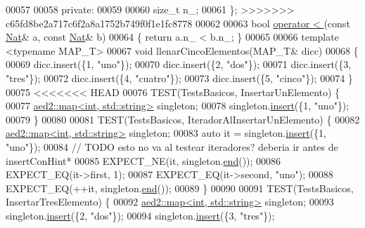 \begin{DoxyCode}
00057 
00058     \textcolor{keyword}{private}:
00059 
00060         \textcolor{keywordtype}{size\_t} n\_;
00061 \};
>>>>>>> c65fd8be2a717c6f2a8a1752b749f0f1e1fc8778
00062 
00063 \textcolor{keywordtype}{bool} \hyperlink{classaed2_1_1map_a8ff07f6a24c290ea7e8f63ec7ab24f8d_a8ff07f6a24c290ea7e8f63ec7ab24f8d}{operator < }(\textcolor{keyword}{const} \hyperlink{classNat}{Nat}& a, \textcolor{keyword}{const} \hyperlink{classNat}{Nat}& b)
00064 \{ \textcolor{keywordflow}{return} a.n\_ < b.n\_; \}
00065 
00066 \textcolor{keyword}{template} <\textcolor{keyword}{typename} MAP\_T>
00067 \textcolor{keywordtype}{void} llenarCincoElementos(MAP\_T& dicc)
00068 \{
00069     dicc.insert(\{1, \textcolor{stringliteral}{"uno"}\});
00070     dicc.insert(\{2, \textcolor{stringliteral}{"dos"}\});
00071     dicc.insert(\{3, \textcolor{stringliteral}{"tres"}\});
00072     dicc.insert(\{4, \textcolor{stringliteral}{"cuatro"}\});
00073     dicc.insert(\{5, \textcolor{stringliteral}{"cinco"}\});
00074 \}
00075 
<<<<<<< HEAD
00076 TEST(TestsBasicos, InsertarUnElemento) \{
00077     \hyperlink{classaed2_1_1map}{aed2::map<int, std::string>} singleton;
00078     singleton.\hyperlink{classaed2_1_1map_a60aacba06b1579630b3c8e996cf248c8_a60aacba06b1579630b3c8e996cf248c8}{insert}(\{1, \textcolor{stringliteral}{"uno"}\});
00079 \}
00080 
00081 TEST(TestsBasicos, IteradorAlInsertarUnElemento) \{
00082     \hyperlink{classaed2_1_1map}{aed2::map<int, std::string>} singleton;
00083     \textcolor{keyword}{auto} it = singleton.\hyperlink{classaed2_1_1map_a60aacba06b1579630b3c8e996cf248c8_a60aacba06b1579630b3c8e996cf248c8}{insert}(\{1, \textcolor{stringliteral}{"uno"}\});
00084     \textcolor{comment}{// TODO esto no va al testear iteradores? deberia ir antes de
       insertConHint*}
00085     EXPECT\_NE(it, singleton.\hyperlink{classaed2_1_1map_a76023e6a56cb625513e1b5ea028bf983_a76023e6a56cb625513e1b5ea028bf983}{end}());
00086     EXPECT\_EQ(it->first, 1);
00087     EXPECT\_EQ(it->second, \textcolor{stringliteral}{"uno"});
00088     EXPECT\_EQ(++it, singleton.\hyperlink{classaed2_1_1map_a76023e6a56cb625513e1b5ea028bf983_a76023e6a56cb625513e1b5ea028bf983}{end}());
00089 \}
00090 
00091 TEST(TestsBasicos, InsertarTresElemento) \{
00092     \hyperlink{classaed2_1_1map}{aed2::map<int, std::string>} singleton;
00093     singleton.\hyperlink{classaed2_1_1map_a60aacba06b1579630b3c8e996cf248c8_a60aacba06b1579630b3c8e996cf248c8}{insert}(\{2, \textcolor{stringliteral}{"dos"}\});
00094     singleton.\hyperlink{classaed2_1_1map_a60aacba06b1579630b3c8e996cf248c8_a60aacba06b1579630b3c8e996cf248c8}{insert}(\{3, \textcolor{stringliteral}{"tres"}\});

\end{DoxyCode}
